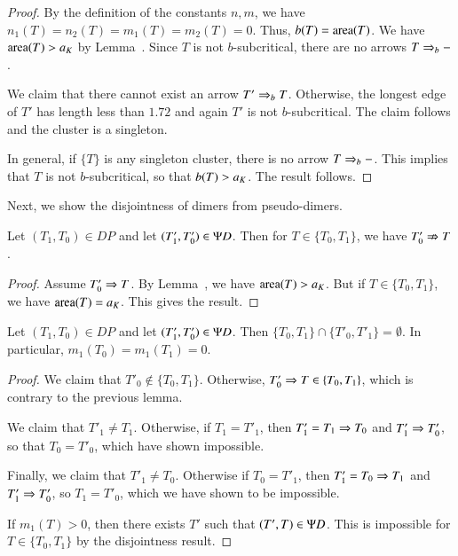 \begin{proof}  By the definition of the constants $n,m$, we have $n_1(T)=n_2(T) = m_1(T)=m_2(T)=0$.
Thus, $b(T)={\operatorname{area}}(T)$.  We have ${\operatorname{area}}(T) > a_K$ by Lemma~.  Since $T$ is not $b$-subcritical,
there are no arrows $T\Rightarrow_{b} -$.  

We claim that there cannot exist an arrow $T'\Rightarrow_{b} T$.
Otherwise,  the longest edge of $T'$ has length less than $1.72$
and again $T'$ is not $b$-subcritical.  The claim follows and the cluster is a singleton.

In general, if $\{T\}$ is any singleton cluster, there is no arrow $T\Rightarrow_{b} -$.  This implies that $T$ is not
$b$-subcritical, so that $b(T) > a_K$.  The result follows.
\end{proof}

Next,
we show the disjointness of dimers from pseudo-dimers.  

\begin{lemma} Let $(T_1,T_0)\in DP$ and let $(T'_1,T'_0)\in\Psi D$.  Then for $T\in\{T_0,T_1\}$,
we have
$T'_0\nRightarrow T$.
\end{lemma}

\begin{proof} Assume  $T'_0\Rightarrow T$.  By Lemma~,
we have ${\operatorname{area}}(T)>a_K$.  But if $T\in\{T_0,T_1\}$, we have ${\operatorname{area}}(T)=a_K$.
This gives the result.
\end{proof}

\begin{lemma}  Let $(T_1,T_0)\in DP$ and let $(T'_1,T'_0)\in\Psi D$.  Then
$\{T_0,T_1\}\cap \{T'_0,T'_1\} = \emptyset$.  In particular, $m_1(T_0) = m_1(T_1)=0$.
\end{lemma}

\begin{proof}
We claim that $T'_0\not\in \{T_0,T_1\}$.  Otherwise, $T'_0\Rightarrow T\in\{T_0,T_1\}$, which is contrary
to the previous lemma.

We claim that $T'_1\ne T_1$.  Otherwise, if $T_1=T'_1$, then $T'_1=T_1\Rightarrow T_0$ and $T'_1\Rightarrow T'_0$,
so that $T_0 = T'_0$, which have shown impossible.

Finally, we claim that $T'_1\ne T_0$.  Otherwise if $T_0 = T'_1$, then $T'_1 = T_0\Rightarrow T_1$ and
$T'_1\Rightarrow T'_0$, so $T_1 = T'_0$, which we have shown to be impossible.

If $m_1(T) >0$, then there exists $T'$ such that $(T',T)\in \Psi D$.  This is impossible for $T\in\{T_0,T_1\}$ by the
disjointness result.
\end{proof}

